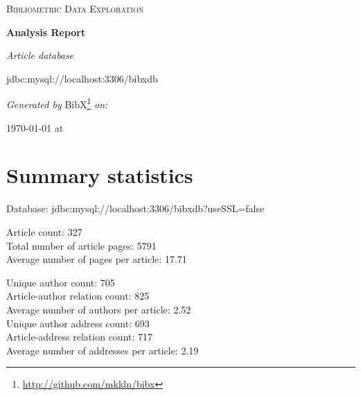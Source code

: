 \documentclass[a4paper]{article}
\begin{document}
{\centering
\hbox{}
\vspace{6cm}
{\Large\scshape Bibliometric Data Exploration\par}
\vspace{1cm}
{\Huge\bfseries Analysis Report\par}
\vspace{1.5cm}
\setlength{\parskip}{0pt}
{\Large\itshape Article database \par jdbc:mysql://localhost:3306/bibxdb \par}
\vspace{6cm}
\setlength{\parskip}{4pt}
{\Large{\itshape Generated by} BibX\footnote{\href{http://github.com/mkkln/bibx}{http://github.com/mkkln/bibx}} {\itshape on:}\par}
\renewcommand{\dateseparator}{.}
\ddmmyyyydate
{\large\today{ at }\currenttime\par}
} %
\thispagestyle{empty}
\enlargethispage{2.5 \baselineskip}
\clearpage

\hbox{}
\thispagestyle{empty}
\clearpage

\setlength\cftaftertoctitleskip{5ex}
\tableofcontents
\clearpage

\section{Summary statistics}

Database: jdbc:mysql://localhost:3306/bibxdb?useSSL=false

Article count: 327\\
\hspace*{0.5cm} Total number of article pages: 5791\\
\hspace*{0.5cm} Average number of pages per article: 17.71

Unique author count: 705\\
\hspace*{0.5cm} Article-author relation count: 825\\
\hspace*{0.5cm} Average number of authors per article: 2.52\\
Unique author address count: 693\\
\hspace*{0.5cm} Article-address relation count: 717\\
\hspace*{0.5cm} Average number of addresses per article: 2.19
\end{document}
